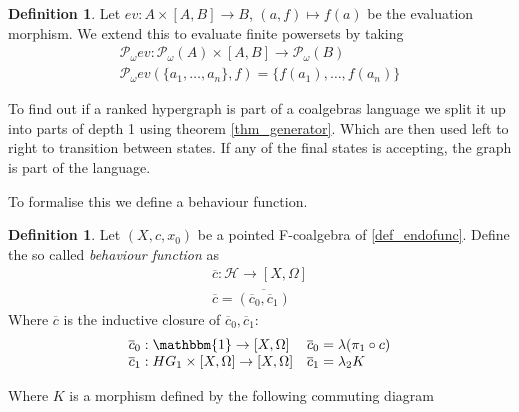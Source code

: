 \documentclass[12pt]{article}
\theoremstyle{definition}
\newtheorem{definition}[theorem]{Definition}
\newcommand{\1}{\mathbbm{1}}
\newcommand{\id}{\text{id}}
\renewcommand{\H}{\mathcal{H}}
\newcommand{\finP}{\mathcal{P}_{\omega}}
\newcommand{\beh}{\overline{c}}
\begin{document}
\begin{definition}
    Let $ev: A\times [A,B] \to B$, $(a, f)\mapsto f(a)$ be the evaluation morphism. We extend this to evaluate finite powersets by taking
    \begin{align*}
        \finP ev: \finP(A)\times [A,B] \to \finP(B)\\
        \finP ev(\{a_1, \dots, a_n\}, f) = \{f(a_1), \dots, f(a_n)\}
    \end{align*}
\end{definition}

To find out if a ranked hypergraph is part of a coalgebras language we split it up into parts of depth 1 using theorem \ref{thm_generator}. Which are then used left to right to transition between states. If any of the final states is accepting, the graph is part of the language.

To formalise this we define a behaviour function.

\begin{definition}
    Let $(X, c, x_0)$ be a pointed F-coalgebra of \ref{def_endofunc}. Define the so called \emph{behaviour function} as
    \begin{align*}
        \beh : \H \to [X, \Omega] \\
        \beh = \overline{(\beh_0, \beh_1)}
    \end{align*}
    Where $\beh$ is the inductive closure of $\beh_0, \beh_1$:\\
    \[
        \begin{array}{ll}
            \beh_0: \1 \to [X, \Omega] & \beh_0 = \lambda(\pi_1\circ c)\\
            \beh_1: HG_1\times [X, \Omega] \to [X, \Omega] & \beh_1 = \lambda_2 K
        \end{array}
    \]

    Where $K$ is a morphism defined by the following commuting diagram
    \begin{center}
    \end{center}
\end{definition}
\newpage
\end{document}
